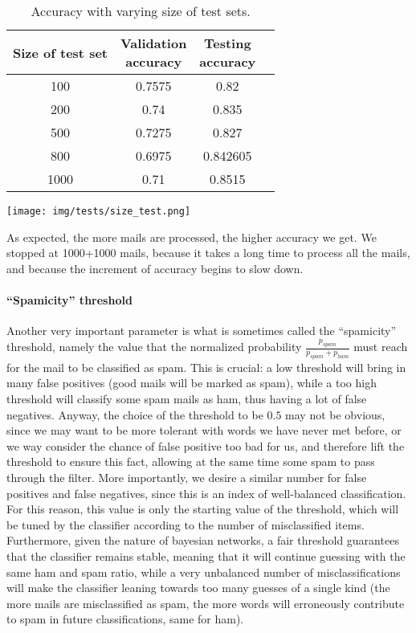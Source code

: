 \begin{center}
\begin{table}[h]
\begin{minipage}{.5\linewidth}
\begin{tabular}{cccc}
\toprule
Size of test set & \shortstack{Validation\\ accuracy} & \shortstack{Testing\\ accuracy}\\
\midrule
100  & 0.7575 & 0.82     \\
200  & 0.74   & 0.835    \\
500  & 0.7275 & 0.827    \\
800  & 0.6975 & 0.842605 \\
1000 & 0.71   & 0.8515   \\
\bottomrule
\end{tabular}
\end{minipage}
\begin{minipage}{.5\linewidth}
\texttt{[image: img/tests/size\_test.png]}
    \label{fig:sizetest}
\end{minipage}
\caption{Accuracy with varying size of test sets.}
\end{table}
\label{tab:sizetest}
\end{center}

As expected, the more mails are processed, the higher accuracy we get. We stopped at 1000+1000 mails, because it takes a long time to process all the mails, and because the increment of accuracy begins to slow down.

\paragraph{``Spamicity'' threshold}
\label{spamthrtest} Another very important parameter is what is sometimes called the ``spamicity'' threshold, namely the value that the normalized probability $\frac{p_{spam}}{p_{spam} + p_{ham}}$ must reach for the mail to be classified as spam. This is crucial: a low threshold will bring in many false positives (good mails will be marked as spam), while a too high threshold will classify some spam mails as ham, thus having a lot of false negatives. Anyway, the choice of the threshold to be $0.5$ may not be obvious, since we may want to be more tolerant with words we have never met before, or we way consider the chance of false positive too bad for us, and therefore lift the threshold to ensure this fact, allowing at the same time some spam to pass through the filter. More importantly, we desire a similar number for false positives and false negatives, since this is an index of well-balanced classification. For this reason, this value is only the starting value of the threshold, which will be tuned by the classifier according to the number of misclassified items. Furthermore, given the nature of bayesian networks, a fair threshold guarantees that the classifier remains stable, meaning that it will continue guessing with the same ham and spam ratio, while a very unbalanced number of misclassifications will make the classifier leaning towards too many guesses of a single kind (the more mails are misclassified as spam, the more words will erroneously contribute to spam in future classifications, same for ham).

